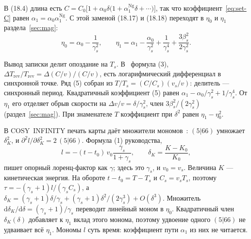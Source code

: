 В (18.4) длина есть $C=C_0\bigl[1+\alpha_0\delta\bigl(1+\alpha_1^{\mathrm{Ng}}\delta+\cdots\bigr)\bigr]$, так что коэффициент~\eqref{eq:set-C} равен $\alpha_1=\alpha_0\alpha_1^{\mathrm{Ng}}$. С этой заменой (18.17) и (18.18) переходят в $\eta_0$ и $\eta_1$ раздела~\ref{sec:mag}:
\begin{equation}
\label{eq:ng-eta}
\eta_0=\alpha_0-\frac{1}{\gamma_s^2},
\qquad
\eta_1=\alpha_1-\frac{\alpha_0}{\gamma_s^2}
+\frac{1}{\gamma_s^4}+\frac{3\beta_s^2}{2\gamma_s^2}.
\end{equation}

Вывод записки делит опоздание на $T_s$. В~\cite{Senichev2013} формула (3), $\Delta T_\mathrm{rev}/T_\mathrm{rev}=\Delta(C/v)/(C/v)$, есть логарифмический дифференциал в синхронной точке. Ряд (5) собран из $T/T_s=(C/C_s)(v_s/v)$: делитель --- синхронный период. Квадратичный коэффициент (5) равен $\alpha_1-\alpha_0/\gamma_s^2+1/\gamma_s^4$. От $\eta_1$ его отделяет обрыв скорости на $\Delta v/v=\delta/\gamma_s^2$, член $3\beta_s^2/(2\gamma_s^2)$ (раздел~\ref{sec:mag}). При знаменателе $T$ коэффициент при $\delta^2$ равен $\eta_1-\eta_0^2$.

В COSY~INFINITY печать карты даёт множители мономов~\cite{COSYmanual}: $(5|66)$ умножает $\delta_K^2$, и $\partial^2 l/\partial\delta_K^2=2\,(5|66)$. Формула (1) руководства,
\begin{equation}
\label{eq:ng-cosy}
l=-(t-t_0)\,v_0\frac{\gamma_s}{1+\gamma_s},
\qquad
\delta_K=\frac{K-K_0}{K_0},
\end{equation}
пишет опорный лоренц-фактор как $\gamma$; здесь это $\gamma_s$, и $v_0=v_s$. Величина $K$ --- кинетическая энергия. На обороте $t-t_0=T-T_s$ и $C_s=v_s T_s$, поэтому $\tau=-(\gamma_s+1)l/(\gamma_s C_s)$, а
$\delta_K=(\gamma_s+1)\delta/\gamma_s+(\gamma_s+1)\delta^2/(2\gamma_s^3)+O(\delta^3)$.
Множитель $\mathrm{d}\delta_K/\mathrm{d}\delta=(\gamma_s+1)/\gamma_s$ переводит линейный моном в $\eta_0$. Квадратичный член $\delta_K(\delta)$ добавляет к $\eta_1$ вклад этого монома, поэтому удвоение одного $(5|66)$ не удваивает всё $\eta_1$. Мономы $l$ суть время: коэффициент пути $\alpha_1$ из них не читается.

